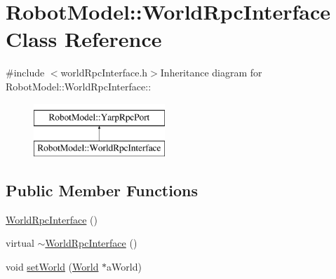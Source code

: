 \hypertarget{class_robot_model_1_1_world_rpc_interface}{
\section{RobotModel::WorldRpcInterface Class Reference}
\label{class_robot_model_1_1_world_rpc_interface}
}


{\ttfamily \#include $<$worldRpcInterface.h$>$}Inheritance diagram for RobotModel::WorldRpcInterface::\begin{figure}[H]
\begin{center}
\leavevmode
\includegraphics[height=2cm]{class_robot_model_1_1_world_rpc_interface}
\end{center}
\end{figure}
\subsection*{Public Member Functions}
\begin{DoxyCompactItemize}
\item 
\hyperlink{class_robot_model_1_1_world_rpc_interface_a214bbac16ce3a3a94aa1bd600090ae2b}{WorldRpcInterface} ()
\item 
virtual \hyperlink{class_robot_model_1_1_world_rpc_interface_a6b990fdbe2cb39fc2d0e2ef9e8139250}{$\sim$WorldRpcInterface} ()
\item 
void \hyperlink{class_robot_model_1_1_world_rpc_interface_ae5a8361ea49e3bfb4218d7bcfd791587}{setWorld} (\hyperlink{class_robot_model_1_1_world}{World} $\ast$aWorld)
\end{DoxyCompactItemize}


